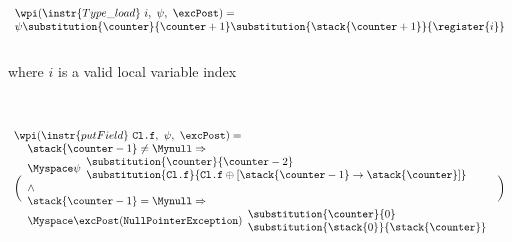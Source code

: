 \begin{figure}[ht]
\[\begin{array}{l}\wpi(\instr{Type\_load} \ i, \ \psi, \ \excPost) =  \\
\psi\substitution{\counter }{\counter+1} \substitution{\stack{\counter+1}}{\register{i}}
\end{array}
\] \\
where $i$ is a valid local variable index   \\
\\
\\
\[
\begin{array}{l}
\wpi(\instr{putField} \ \texttt{Cl.f}, \ \psi, \ \excPost) = \\
\biggl( 
\begin{array}{l}
   		\stack{\counter -1} \not= \Mynull\Rightarrow   \\
	\Myspace \psi\begin{array}{l} \substitution{\counter}{ \counter-2 } \\[0 mm] 
   	                   \substitution{\texttt{Cl.f} }{ \texttt{Cl.f}\oplus [\stack{\counter -1} \rightarrow \stack{\counter}] } \\
		\end{array}\\
   \wedge \\
   	\stack{\counter-1} = \Mynull 	\Rightarrow\\
   \Myspace	 \excPost(\tt{NullPointerException})
        \begin{array}{l}
          \substitution{ \counter }{ 0} \\
          \substitution{\stack{0}}{ \stack{\counter}} 
	\end{array}
    \end{array} \biggr)
\end{array}
 \]	  \\



\end{figure}
